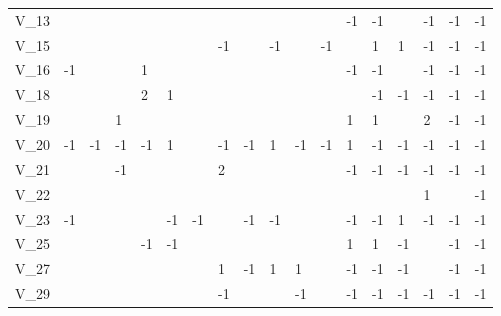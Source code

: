\begin{tabular}{llllllllllllllllll}
V\_13   &         &       &       &           &      &       &            &       &                &            &         &         -1 &         -1 &        &    -1 &   -1 &    -1 \\
V\_15   &         &       &       &           &      &       &         -1 &       &             -1 &            &      -1 &            &          1 &      1 &    -1 &   -1 &    -1 \\
V\_16   &      -1 &       &       &         1 &      &       &            &       &                &            &         &         -1 &         -1 &        &    -1 &   -1 &    -1 \\
V\_18   &         &       &       &         2 &    1 &       &            &       &                &            &         &            &         -1 &     -1 &    -1 &   -1 &    -1 \\
V\_19   &         &       &     1 &           &      &       &            &       &                &            &         &          1 &          1 &        &     2 &   -1 &    -1 \\
V\_20   &      -1 &    -1 &    -1 &        -1 &    1 &       &         -1 &    -1 &              1 &         -1 &      -1 &          1 &         -1 &     -1 &    -1 &   -1 &    -1 \\
V\_21   &         &       &    -1 &           &      &       &          2 &       &                &            &         &         -1 &         -1 &     -1 &    -1 &   -1 &    -1 \\
V\_22   &         &       &       &           &      &       &            &       &                &            &         &            &            &        &     1 &      &    -1 \\
V\_23   &      -1 &       &       &           &   -1 &    -1 &            &    -1 &             -1 &            &         &         -1 &         -1 &      1 &    -1 &   -1 &    -1 \\
V\_25   &         &       &       &        -1 &   -1 &       &            &       &                &            &         &          1 &          1 &     -1 &       &   -1 &    -1 \\
V\_27   &         &       &       &           &      &       &          1 &    -1 &              1 &          1 &         &         -1 &         -1 &     -1 &       &   -1 &    -1 \\
V\_29   &         &       &       &           &      &       &         -1 &       &                &         -1 &         &         -1 &         -1 &     -1 &    -1 &   -1 &    -1 \\

\end{tabular}
